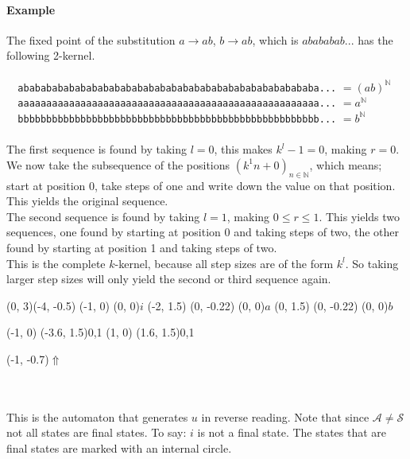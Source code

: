 \documentclass{article}
\begin{document}
\paragraph{Example}
The fixed point of the substitution $a \rightarrow ab$, $b \rightarrow ab$, 
which is $abababab...$ has the following 2-kernel.\\
\\
\verb#  ababababababababababababababababababababababababababa...#
$= (ab)^\mathbb{N}$\\
\verb#  aaaaaaaaaaaaaaaaaaaaaaaaaaaaaaaaaaaaaaaaaaaaaaaaaaaaa...#
$= a^\mathbb{N}$\\
\verb#  bbbbbbbbbbbbbbbbbbbbbbbbbbbbbbbbbbbbbbbbbbbbbbbbbbbbb...#
$= b^\mathbb{N}$\\
\\
The first sequence is found by taking $l = 0$, this makes $k^l - 1 = 0$, 
making $r = 0$. We now take the subsequence of the positions 
$(k^1n + 0)_{n \in \mathbb{N}}$, which means; start at position 0, take 
steps of one and write down the value on that position. This yields the 
original sequence.\\
The second sequence is found by taking $l = 1$, making $0 \le r \le 1$. 
This yields two sequences, one found by starting at position 0 and taking
steps of two, the other found by starting at position 1 and taking steps of
two.\\
This is the complete $k$-kernel, because all step sizes are of the form 
$k^l$. So taking larger step sizes will only yield the second or third
sequence again.\\
\begin{graph}(0, 3)(-4, -0.5)
  (-1, 0) (0, 0){$i$}
  (-2, 1.5) 
    (0, -0.22){} (0, 0){$a$} 
  (0, 1.5) 
    (0, -0.22){} (0, 0){$b$}

   
   
  (-1, 0) \freetext(-3.6, 1.5){0,1}
  (1, 0) \freetext(1.6, 1.5){0,1}
  
  \freetext(-1, -0.7){$\Uparrow$}
\end{graph}\\
\\
This is the automaton that generates $u$ in reverse reading. Note that since 
$\mathcal{A \ne S}$ not all states are final states. To say: $i$ is not a 
final state. The states that are final states are marked with an internal
circle.
\end{document}
